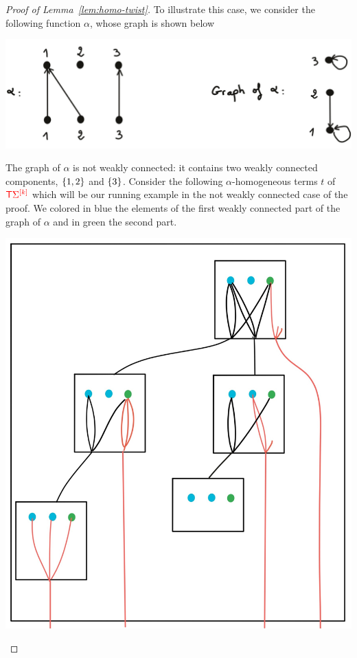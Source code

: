 \begin{proof}[Proof of Lemma~\ref{lem:homo-twist}]
\smallskip
To illustrate this case, we consider the following function $\alpha$, whose graph is shown below
\begin{center}
\includegraphics[scale=.07]{MyPic27.jpg}
\end{center}
The graph of $\alpha$ is not weakly connected: it contains two weakly connected components, $\{1,2\}$ and $\{3\}$.
Consider the following $\alpha$-homogeneous terms $t$ of ${\color{red}{\mathsf T}} {\color{red}{\Sigma}}^{{\color{red}{[k]}}}$ which will be our running example in the not weakly connected case of the proof. We colored in blue the elements of the first weakly connected part of the graph of $\alpha$ and in green the second part.
\begin{center}
\includegraphics[scale=.07]{MyPic28.jpg}
\end{center}

\end{proof}
